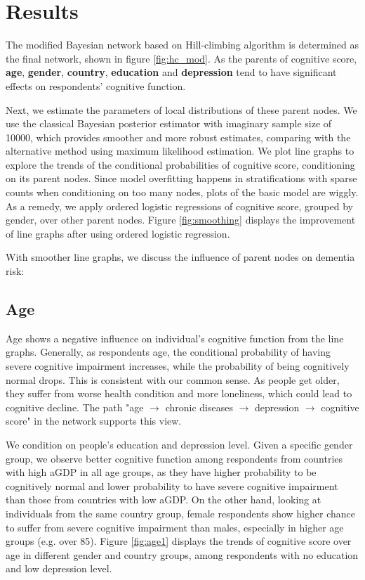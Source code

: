 \documentclass[11pt,twoside]{article}
\numberwithin{Theorem}{section}
\numberwithin{Definition}{section}
\numberwithin{Lemma}{section}
\numberwithin{Algorithm}{section}
\numberwithin{equation}{section}
\begin{document}
\clearpage

\section{Results}
\label{sec:results}

The modified Bayesian network based on Hill-climbing algorithm is determined as the final network, shown in figure \ref{fig:hc_mod}.  As the parents of cognitive score, \textbf{age}, \textbf{gender}, \textbf{country}, \textbf{education} and \textbf{depression} tend to have significant effects on respondents' cognitive function. 

Next, we estimate the parameters of local distributions of these parent nodes. We use the classical Bayesian posterior estimator with imaginary sample size of 10000, which provides smoother and more robust estimates, comparing with the alternative method using maximum likelihood estimation. We plot line graphs to explore the trends of the conditional probabilities of cognitive score, conditioning on its parent nodes. Since model overfitting happens in stratifications with sparse counts when conditioning on too many nodes, plots of the basic model are wiggly. As a remedy, we apply ordered logistic regressions of cognitive score, grouped by gender, over other parent nodes. Figure \ref{fig:smoothing} displays the improvement of line graphs after using ordered logistic regression.


With smoother line graphs, we discuss the influence of parent nodes on dementia risk:

\subsection{Age}

Age shows a negative influence on individual's cognitive function from the line graphs. Generally, as respondents age, the conditional probability of having severe cognitive impairment increases, while the probability of being cognitively normal drops. This is consistent with our common sense. As people get older, they suffer from worse health condition and more loneliness, which could lead to cognitive decline. The path "age $\rightarrow$ chronic diseases $\rightarrow$ depression $\rightarrow$ cognitive score" in the network supports this view. 

We condition on people's education and depression level. Given a specific gender group, we observe better cognitive function among respondents from countries with high aGDP in all age groups, as they have higher probability to be cognitively normal and lower probability to have severe cognitive impairment than those from countries with low aGDP. On the other hand, looking at individuals from the same country group, female respondents show higher chance to suffer from severe cognitive impairment than males, especially in higher age groups (e.g. over 85). Figure \ref{fig:age1} displays the trends of cognitive score over age in different gender and country groups, among respondents with no education and low depression level.
\end{document}
